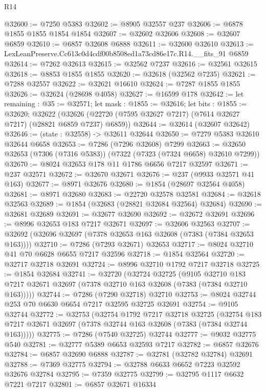\begin{lexlean}{R14}
\begin{coremodule}
@32600 := @7250 @5383
@32602 := @8905 @32557 @237
@32606 := @6878 @1855 @1855 @1854 @1854
@32607 := @32602 @32606
@32608 := @32607 @6859
@32610 := @6857 @32608 @6888
@32611 := @32600 @32610
@32613 := LexLeanPreserve.Cc613c0d4cdf00b8508ed1a73cd86e17c.R14.__fits_91 @6859
@32614 := @7262 @32613
@32615 := @32562 @7237
@32616 := @32561 @32615
@32618 := @8853 @1855 @1855
@32620 := @32618 (@32562 @7235)
@32621 := @7288 @32557
@32622 := @32621 @16610
@32624 := @7287 @1855 @1855
@32626 := @32624 (@28698 @4058)
@32627 := @16599 @178
@32642 := let remaining : @35 := @32571;
  let mask : @1855 := @32616;
  let bits : @1855 := @32620;
  @32622 (@32626 (@22720 (@7595 @32627 @7217) (@7614 @32627 @7217) (@28821 @6859 @7237) @6859))
@32644 := @32614 (@32607 @32642)
@32646 := (state : @32558) -> @32611 @32644
@32650 := @7279 @5383 @32610 @32644 @6658
@32653 := @7286 (@7296 @32608) @7299
@32663 := @32650 @32653 (@7306 (@7316 @5383)) (@7322 (@7323 (@7324 @6658) @32610 @7299))
@32670 := @8024 @32653 @178 @11 @1786 @6656 @7217 @32597
@32671 := @237 @32571
@32672 := @32670 @32671
@32676 := @237 (@9933 @32571 @41 @163)
@32677 := @8971 @32676
@32680 := @1854 (@28697 @32564 @4058)
@32681 := @8971 @32680
@32683 := @22720 @32578 @32581
@32684 := @32618 @32563
@32689 := @1854 (@32683 (@28821 @32684 @32564) @32684)
@32690 := @32681 @32689
@32691 := @32677 @32690
@32692 := @32672 @32691
@32696 := @8996 @32653 @183 @7217 @32671
@32697 := @32606 @32563
@32707 := @32692 (@32696 @32697 (@7378 @32653 @163 @32608 (@7383 (@7384 @32653 @163))))
@32710 := @7286 (@7293 @32671) @32653
@32717 := @8024 @32710 @41 @70 @6628 @6655 @7217 @32596
@32718 := @1854 @32564
@32720 := @32717 @32718 @32691
@32724 := @8996 @32710 @1792 @7217 @32718
@32725 := @1854 @32684
@32741 := @32720
    (@32724
      @32725
      (@9105
        @32710
        @183
        @7217
        @32671
        @32697
        (@7378 @32710 @163 @32608 (@7383 (@7384 @32710 @163)))))
@32744 := @7286 (@7290 @32718) @32710
@32753 := @8024 @32744 @253 @70 @6630 @6654 @7217 @32595 @32725 @32691
@32754 := @9105 @32744
@32772 := @32753
    (@32754
      @1792
      @7217
      @32718
      @32725
      (@32754 @183 @7217 @32671 @32697 (@7378 @32744 @163 @32608 (@7383 (@7384 @32744 @163)))))
@32775 := @7286 (@7540 @32725) @32744
@32777 := @9032 @32775 @540
@32781 := @32777 @5389 @6653 @32593 @7217
@32782 := @6857 @32676
@32784 := @6857 @32690 @6888
@32787 := @32781 (@32782 @32784) @32691
@32788 := @7369 @32775
@32794 := @32788 @6633 @6652 @7223 @32592 @32676 @32784
@32795 := @7359 @32775
@32799 := @32795 @1117 @6632 @7221 @7217
@32801 := @6857 @32671 @16334

\end{coremodule}
\end{lexlean}
